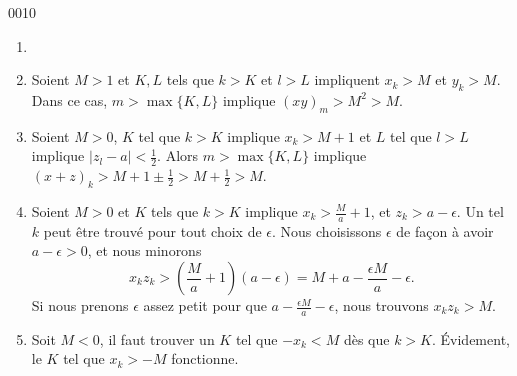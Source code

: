 
\begin{corrige}{0010}

\begin{enumerate}
    \item
\item Soient $M>1$ et $K,L$ tels que $k>K$ et $l>L$ impliquent $x_k>M$ et $y_k>M$. Dans ce cas, $m>\max\{K,L\}$ implique $(xy)_m>M^2>M$.
\item Soient $M>0$, $K$ tel que $k>K$ implique $x_k>M+1$ et $L$ tel que $l>L$ implique $| z_l-a |<\frac{ 1 }{2}$. Alors $m>\max\{ K,L \}$ implique $(x+z)_k>M+1\pm\frac{ 1 }{2}>M+\frac{ 1 }{2}>M$.
\item Soient $M>0$ et $K$ tels que $k>K$ implique $x_k>\frac{ M }{ a }+1$, et $z_k>a-\epsilon$. Un tel $k$ peut être trouvé pour tout choix de $\epsilon$. Nous choisissons $\epsilon$ de façon à avoir $a-\epsilon>0$, et nous minorons
\begin{equation}
	x_kz_k>\left( \frac{ M }{ a }+1 \right)(a-\epsilon)=M+a-\frac{ \epsilon M }{ a }-\epsilon.
\end{equation}
Si nous prenons $\epsilon$ assez petit pour que $a-\frac{ \epsilon M }{ a }-\epsilon$, nous trouvons $x_kz_k>M$.

\item Soit $M<0$, il faut trouver un $K$ tel que $-x_k<M$ dès que $k>K$. Évidement, le $K$ tel que $x_k>-M$ fonctionne.

\end{enumerate}

\end{corrige}

